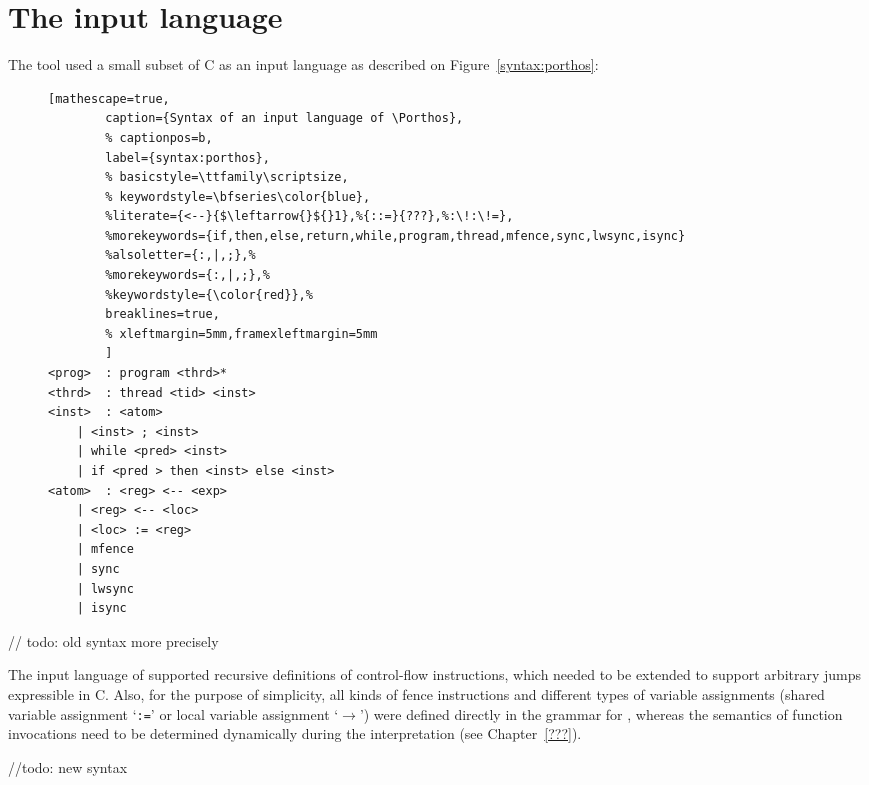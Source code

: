 \chapter{The input language}
\label{ch:impl}

The \Porthos tool used a small subset of C as an input language as described on Figure~\ref{syntax:porthos}\cite{Porthos17}:

\begin{figure}[H]
\begin{multicols}{2}
\begin{lstlisting}[mathescape=true,
        caption={Syntax of an input language of \Porthos},
        % captionpos=b,
        label={syntax:porthos},
        % basicstyle=\ttfamily\scriptsize,
        % keywordstyle=\bfseries\color{blue},
        %literate={<--}{$\leftarrow{}${}1},%{::=}{???},%:\!:\!=},
        %morekeywords={if,then,else,return,while,program,thread,mfence,sync,lwsync,isync}
        %alsoletter={:,|,;},%
        %morekeywords={:,|,;},%
        %keywordstyle={\color{red}},% 
        breaklines=true,
        % xleftmargin=5mm,framexleftmargin=5mm
        ]
<prog>  : program <thrd>*
<thrd>  : thread <tid> <inst>
<inst>  : <atom> 
    | <inst> ; <inst>
    | while <pred> <inst>
    | if <pred > then <inst> else <inst>
<atom>  : <reg> <-- <exp> 
    | <reg> <-- <loc>
    | <loc> := <reg> 
    | mfence
    | sync
    | lwsync
    | isync
\end{lstlisting}
\end{multicols}
\end{figure}

// todo: old syntax more precisely

The input language of \Porthos supported recursive definitions of control-flow instructions, which needed to be extended to support arbitrary jumps expressible in C. Also, for the purpose of simplicity, all kinds of fence instructions and different types of variable assignments (shared variable assignment `\texttt{:=}' or local variable assignment `$\mathtt{\rightarrow}$') were defined directly in the grammar for \Porthos, whereas the semantics of function invocations need to be determined dynamically during the interpretation
(see Chapter~\ref{???}).

//todo: new syntax